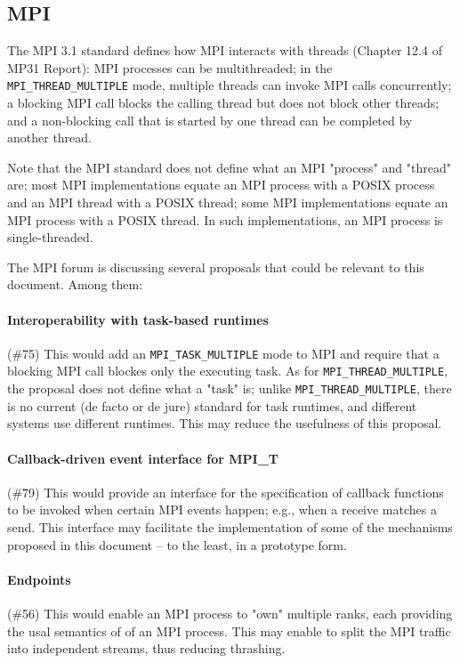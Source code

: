 \documentclass[twoside,11pt]{article}
\begin{document}
\subsection{MPI}
	The MPI 3.1 standard defines how MPI interacts with threads (Chapter 12.4 
	of 
	MP31 Report): MPI processes can be multithreaded; in the 
	\texttt{MPI\_THREAD\_MULTIPLE} mode, multiple threads can invoke MPI calls 
	concurrently; a blocking MPI call blocks the calling thread but does not 
	block other threads; and a 
	non-blocking call that is started by one thread can be completed by another 
	thread. 
	
	Note that the MPI standard does not define what an MPI "process" and 
	"thread" are; most MPI implementations equate an MPI process with a POSIX 
	process and an MPI thread with a POSIX thread; some MPI implementations 
	equate an MPI process with a POSIX thread. In such implementations, an MPI 
	process is single-threaded.	
	
	The MPI forum is discussing several proposals that could be relevant to 
	this document. Among them:
	
	\paragraph{Interoperability with task-based runtimes} (\#75) This would add 
	an \texttt{MPI\_TASK\_MULTIPLE} mode to MPI and require that a blocking MPI 
	call blockes only the executing task. As for 
	\texttt{MPI\_THREAD\_MULTIPLE}, the proposal does not define what a "task" 
	is; unlike  \texttt{MPI\_THREAD\_MULTIPLE}, there is no current (de facto 
	or de jure) standard for task runtimes, and different systems use different 
	runtimes. This may reduce the usefulness of this proposal.
	
	\paragraph{Callback-driven event interface for MPI\_T} (\#79) This would 
	provide an interface for the specification of callback functions to be 
	invoked when certain MPI events happen; e.g., when a receive matches a 
	send. This interface may facilitate the implementation of some of the 
	mechanisms proposed in this document -- to the least, in a prototype form.
	
	\paragraph{Endpoints} (\#56) This would enable an MPI process to "own" 
	multiple ranks, each providing the usal semantics of of an MPI process. 
	This may enable to split the MPI traffic into independent streams, thus 
	reducing thrashing.
	
\end{document}

